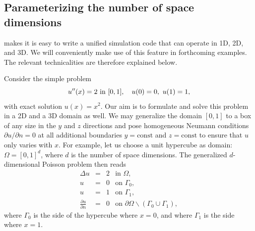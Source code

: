 \subsection{Parameterizing the number of space dimensions}
\label{langtangen:poisson:nD}

\fenics{} makes it is easy to write a unified simulation code that can operate
in 1D, 2D, and 3D. We will conveniently make use of this feature in
forthcoming examples. The relevant technicalities are therefore explained
below.

Consider the simple problem
\begin{equation}
u''(x) = 2\hbox{ in }[0,1],\quad u(0)=0,\ u(1)=1,
\end{equation}
with exact solution $u(x)=x^2$. Our aim is to formulate and solve this
problem in a 2D and a 3D domain as well.
We may generalize the domain $[0,1]$ to a box of any size
in the $y$ and $z$ directions and pose homogeneous Neumann
conditions $\partial u/\partial n = 0$ at all additional boundaries
$y=\mbox{const}$ and $z=\mbox{const}$ to ensure that $u$ only varies with
$x$. For example, let us choose
a unit hypercube as domain: $\Omega = [0,1]^d$, where $d$ is the number
of space dimensions. The generalized $d$-dimensional Poisson problem
then reads
\begin{equation} \label{langtangen:poisson1:ddim}
  \begin{array}{rcll}
    \Delta u &=& 2 &\mbox{in } \Omega, \\
    u &=& 0 &\mbox{on } \Gamma_0,\\
    u &=& 1 &\mbox{on } \Gamma_1,\\
\frac{\partial u}{\partial n} &=& 0 &\mbox{on } \partial\Omega\backslash\left(
\Gamma_0\cup\Gamma_1\right),
  \end{array}
\end{equation}
where $\Gamma_0$ is the side of the hypercube where $x=0$, and
where $\Gamma_1$ is the side where $x=1$.

